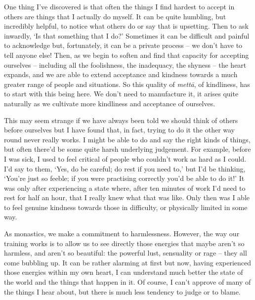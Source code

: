 One thing I've discovered is that often the things I find hardest to accept in others are things that I actually do myself. It can be quite humbling, but incredibly helpful, to notice what others do or say that is upsetting. Then to ask inwardly, `Is that something that I do?' Sometimes it can be difficult and painful to acknowledge but, fortunately, it can be a private process -- we don't have to tell anyone else! Then, as we begin to soften and find that capacity for accepting ourselves -- including all the foolishness, the inadequacy, the shyness -- the heart expands, and we are able to extend acceptance and kindness towards a much greater range of people and situations. So this quality of \textit{mett\=a}, of kindliness, has to start with this being here. We don't need to manufacture it, it arises quite naturally as we cultivate more kindliness and acceptance of ourselves.

This may seem strange if we have always been told we should think of others before ourselves but I have found that, in fact, trying to do it the other way round never really works. I might be able to do and say the right kinds of things, but often there'd be some quite harsh underlying judgement. For example, before I was sick, I used to feel critical of people who couldn't work as hard as I could. I'd say to them, `Yes, do be careful; do rest if you need to,' but I'd be thinking, `You're just so feeble; if you were practising correctly you'd be able to do it!' It was only after experiencing a state where, after ten minutes of work I'd need to rest for half an hour, that I really knew what that was like. Only then was I able to feel genuine kindness towards those in difficulty, or physically limited in some way.

As monastics, we make a commitment to harmlessness. However, the way our training works is to allow us to see directly those energies that maybe aren't so harmless, and aren't so beautiful: the powerful lust, sensuality or rage -- they all come bubbling up. It can be rather alarming at first but now, having experienced those energies within my own heart, I can understand much better the state of the world and the things that happen in it. Of course, I can't approve of many of the things I hear about, but there is much less tendency to judge or to blame.

